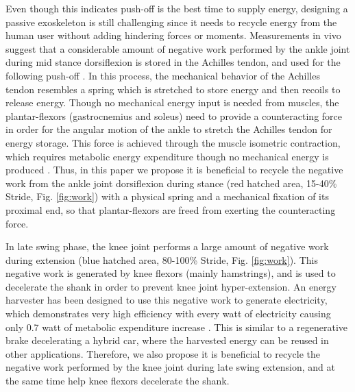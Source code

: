 \documentclass[10pt]{asme2ej}
\begin{document}
Even though this indicates push-off is the best time to supply energy, designing a passive exoskeleton is still challenging since it needs to recycle energy from the human user without adding hindering forces or moments.
Measurements in vivo suggest that a considerable amount of negative work performed by the ankle joint during mid stance dorsiflexion is stored in the Achilles tendon, and used for the following push-off \cite{RN16}.
In this process, the mechanical behavior of the Achilles tendon resembles a spring which is stretched to store energy and then recoils to release energy.
Though no mechanical energy input is needed from muscles, the plantar-flexors (gastrocnemius and soleus) need to provide a counteracting force in order for the angular motion of the ankle to stretch the Achilles tendon for energy storage.
This force is achieved through the muscle isometric contraction, which requires metabolic energy expenditure though no mechanical energy is produced \cite{RN17}.
Thus, in this paper we propose it is beneficial to recycle the negative work from the ankle joint dorsiflexion during stance (red hatched area, 15-40\% Stride, Fig. \ref{fig:work}) with a physical spring and a mechanical fixation of its proximal end, so that plantar-flexors are freed from exerting the counteracting force.

In late swing phase, the knee joint performs a large amount of negative work during extension (blue hatched area, 80-100\% Stride, Fig. \ref{fig:work}).
This negative work is generated by knee flexors (mainly hamstrings), and is used to decelerate the shank in order to prevent knee joint hyper-extension.
An energy harvester has been designed to use this negative work to generate electricity, which demonstrates very high efficiency with every watt of electricity causing only 0.7 watt of metabolic expenditure increase \cite{RN18}.
This is similar to a regenerative brake decelerating a hybrid car, where the harvested energy can be reused in other applications.
Therefore, we also propose it is beneficial to recycle the negative work performed by the knee joint during late swing extension, and at the same time help knee flexors decelerate the shank.
\end{document}
